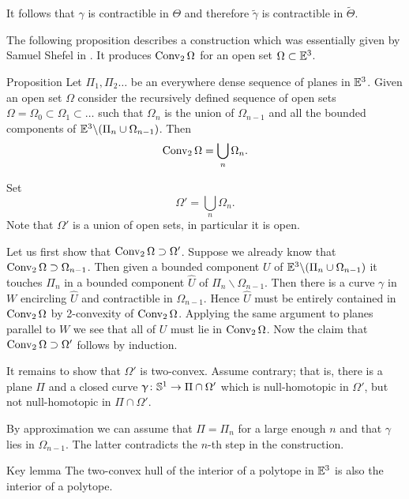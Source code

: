 It follows that $\gamma$ is contractible in $\Theta$ 
and therefore $\tilde\gamma$ is contractible in $\tilde\Theta$.
\qeds

The following proposition 
describes a construction which was essentially given by Samuel Shefel in \cite{shefel-3D}.
It produces $\mathop{\rm Conv}\nolimits_2 \Omega$ for an open set $\Omega\subset\EE^3$.

\begin{thm}{Proposition}\label{prop:2-conv-construction}
Let $\Pi_1,\Pi_2\dots$ be an everywhere dense
sequence of planes in $\mathbb{E}^3$.
Given an open set $\Omega$ consider 
the recursively  defined sequence of open sets 
$\Omega=\Omega_0\subset\Omega_1\subset\dots$ 
such that 
$\Omega_n$ is the union of $\Omega_{n-1}$ 
and all the bounded components of 
$\EE^3\backslash(\Pi_n\cup \Omega_{n-1})$.
Then 
\[\mathop{\rm Conv}\nolimits_2\Omega=\bigcup_n\Omega_n.\]

\end{thm}

Set 
\[\Omega'=\bigcup_n\Omega_n.\]
Note that $\Omega'$ is a union of open sets, in particular it is open.

Let us first show that  $\Conv_2\Omega\supset\Omega'$.  Suppose we already know that  $\Conv_2\Omega\supset\Omega_{n-1}$. Then given a bounded component  $U$ of $\EE^3\backslash(\Pi_n\cup \Omega_{n-1})$ it touches $\Pi_{n}$ in a bounded component  $\hat U$ of $\Pi_{n}\backslash \Omega_{n-1}$. Then there is a curve $\gamma$ in $W$ encircling  $\hat U$ and contractible in $\Omega_{n-1}$. Hence $\hat U$ must be entirely contained in $\mathop{\rm Conv}\nolimits_2\Omega$ by 2-convexity of  $\mathop{\rm Conv}\nolimits_2\Omega$. Applying the same argument to planes parallel to $W$ we see that all of $U$ must lie in $\mathop{\rm Conv}\nolimits_2\Omega$. Now the claim that $\Conv_2\Omega\supset\Omega'$ follows by induction.


It remains to show that $\Omega'$ is two-convex.
Assume contrary; 
that is, there is a plane $\Pi$ 
and a closed curve $\gamma\:\SS^1\to \Pi\cap \Omega'$ 
which is null-homotopic in $\Omega'$,
but not null-homotopic in $\Pi\cap\Omega'$.

By approximation we can assume that $\Pi=\Pi_n$ for a large enough  $n$ 
and that $\gamma$ lies in $\Omega_{n-1}$.
The latter contradicts the $n$-th step in the construction. 
\qeds



\begin{thm}{Key lemma}\label{lem:key-shefel}
The two-convex hull of the interior of a polytope in $\mathbb{E}^3$
is also the interior of a polytope.
\end{thm}

